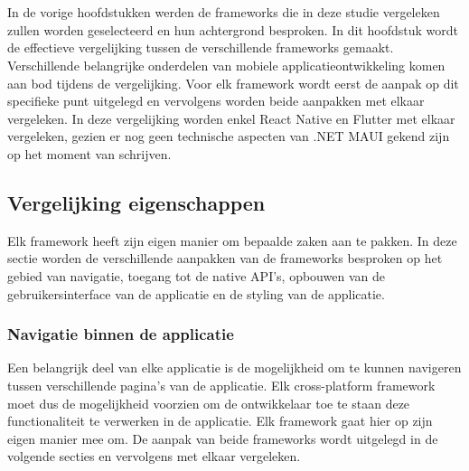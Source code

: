 
\chapter{}
\label{ch:methodologie}


In de vorige hoofdstukken werden de frameworks die in deze studie vergeleken zullen worden geselecteerd en hun achtergrond besproken. In dit hoofdstuk wordt de effectieve vergelijking tussen de verschillende frameworks gemaakt. Verschillende belangrijke onderdelen van mobiele applicatieontwikkeling komen aan bod tijdens de vergelijking. Voor elk framework wordt eerst de aanpak op dit specifieke punt uitgelegd en vervolgens worden beide aanpakken met elkaar vergeleken. In deze vergelijking worden enkel React Native en Flutter met elkaar vergeleken, gezien er nog geen technische aspecten van .NET MAUI gekend zijn op het moment van schrijven.

\section{Vergelijking eigenschappen}
\label{sec:vglEigenschappen}

Elk framework heeft zijn eigen manier om bepaalde zaken aan te pakken. In deze sectie worden de verschillende aanpakken van de frameworks besproken op het gebied van navigatie, toegang tot de native API's, opbouwen van de gebruikersinterface van de applicatie en de styling van de applicatie.

\subsection{Navigatie binnen de applicatie}
\label{subsec:navigatieApplicatie}

Een belangrijk deel van elke applicatie is de mogelijkheid om te kunnen navigeren tussen verschillende pagina's van de applicatie. Elk cross-platform framework moet dus de mogelijkheid voorzien om de ontwikkelaar toe te staan deze functionaliteit te verwerken in de applicatie. Elk framework gaat hier op zijn eigen manier mee om. De aanpak van beide frameworks wordt uitgelegd in de volgende secties en vervolgens met elkaar vergeleken.


